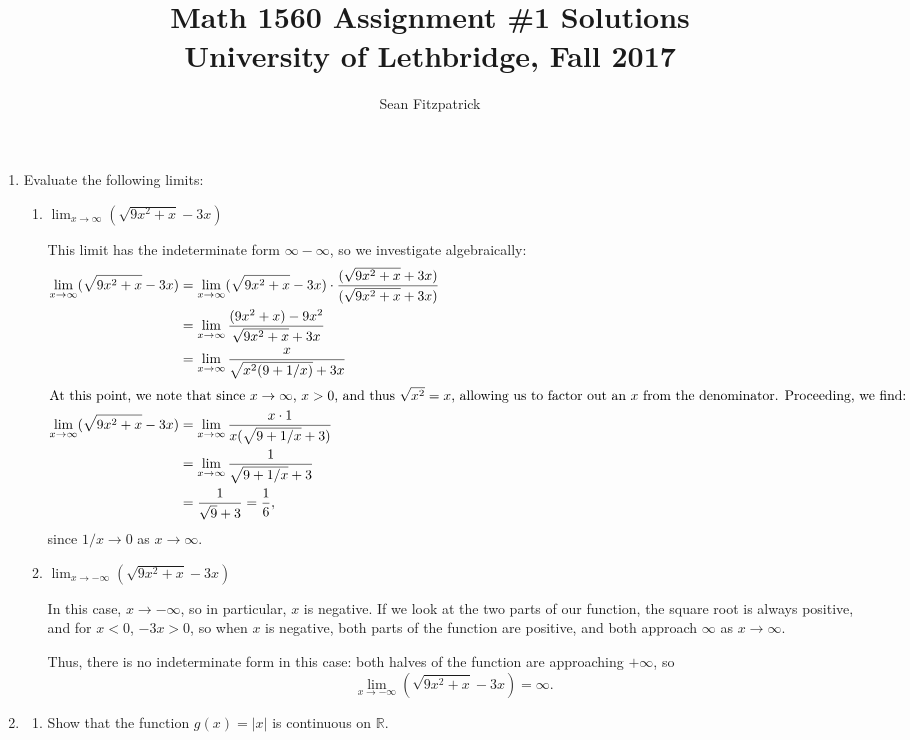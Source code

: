 \documentclass[letterpaper,12pt]{article}
\title{Math 1560 Assignment \#1 Solutions\\University of Lethbridge, Fall 2017}
\author{Sean Fitzpatrick}
\newcommand{\abs}[1]{\lvert #1\rvert}
\newcommand{\R}{\mathbb{R}}
\newcommand{\di}{\displaystyle}
\begin{document}
 \maketitle


\begin{enumerate}
\item Evaluate the following limits:
\begin{enumerate}
\item $\di \lim_{x\to \infty}(\sqrt{9x^2+x}-3x)$

This limit has the indeterminate form $\infty-\infty$, so we investigate algebraically:
\begin{align*}
\lim_{x\to \infty}(\sqrt{9x^2+x}-3x) & = \lim_{x\to \infty}(\sqrt{9x^2+x}-3x)\cdot\frac{(\sqrt{9x^2+x}+3x)}{(\sqrt{9x^2+x}+3x)}\\
& = \lim_{x\to \infty}\frac{(9x^2+x)-9x^2}{\sqrt{9x^2+x}+3x}\\
& = \lim_{x\to \infty}\frac{x}{\sqrt{x^2(9+1/x)}+3x}\\
\intertext{At this point, we note that since $x\to \infty$, $x>0$, and thus $\sqrt{x^2}=x$, allowing us to factor out an $x$ from the denominator. Proceeding, we find:}
\lim_{x\to \infty}(\sqrt{9x^2+x}-3x) & = \lim_{x\to\infty}\frac{x\cdot 1}{x(\sqrt{9+1/x}+3)}\\
& = \lim_{x\to\infty}\frac{1}{\sqrt{9+1/x}+3}\\
& = \frac{1}{\sqrt{9}+3}=\frac{1}{6},
\end{align*}
since $1/x\to 0$ as $x\to \infty$.

\item $\di \lim_{x\to -\infty}(\sqrt{9x^2+x}-3x)$

In this case, $x\to -\infty$, so in particular, $x$ is negative. If we look at the two parts of our function, the square root is always positive, and for $x<0$, $-3x>0$, so when $x$ is negative, both parts of the function are positive, and both approach $\infty$ as $x\to \infty$. 

Thus, there is no indeterminate form in this case: both halves of the function are approaching $+\infty$, so
\[
\lim_{x\to -\infty}(\sqrt{9x^2+x}-3x)=\infty.
\]
\end{enumerate}

\bigskip

\item 
\begin{enumerate}
\item Show that the function $g(x)=\abs{x}$ is continuous on $\R$.


\end{enumerate}
\end{enumerate}
\end{document}
